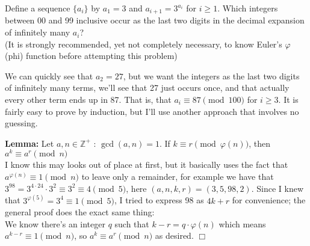 \begin{problem}[N][3][Putnam 1985 A4]
    Define a sequence $\{a_i\}$ by $a_1=3$ and $a_{i+1}=3^{a_i}$ for $i \geq 1$. Which integers between 00 and 99 inclusive occur as the last two digits in the decimal expansion of infinitely many $a_i$?\\
    (It is strongly recommended, yet not completely necessary, to know Euler's $\varphi$ (phi) function before attempting this problem)
\end{problem}

\begin{solution}[only 87]
    We can quickly see that $a_2=27$, but we want the integers as the last two digits of infinitely many terms, we'll see that 27 just occurs once, and that actually every other term ends up in 87. That is, that $a_i \equiv87 \pmod{100}$ for $i\geq3$. It is fairly easy to prove by induction, but I'll use another approach that involves no guessing.
    
    \textbf{Lemma:} Let $a,n \in \mathbb{Z}^+$ : $\gcd(a,n)=1$. If $k \equiv r \pmod{\varphi(n)}$, then $a^k \equiv a^r \pmod{n}$ 
    \vspace{3mm}\\
    I know this may looks out of place at first, but it basically uses the fact that $a^{\varphi(n)} \equiv 1 \pmod n$ to leave only a remainder, for example we have that $3^{98} = 3^{4 \cdot24} \cdot 3^2 \equiv 3^2 \equiv 4 \pmod5$, here $(a,n,k,r)=(3,5,98,2)$. Since I knew that $3^{\varphi(5)}=3^4\equiv1 \pmod 5$, I tried to express 98 as $4k+r$ for convenience; the general proof does the exact same thing:\\
    We know there's an integer $q$ such that $k-r = q \cdot \varphi(n)$ which means $a^{k-r} \equiv 1 \pmod n$, so $a^k \equiv a^r \pmod n$ as desired. $\Box$ \vspace{3mm} \\


\end{solution}
